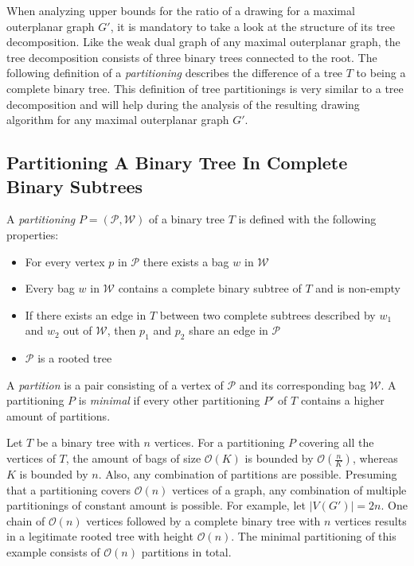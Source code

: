 When analyzing upper bounds for the ratio of a drawing for a maximal outerplanar graph $G'$, it is mandatory to take a look at the structure of its tree decomposition. Like the weak dual graph of any maximal outerplanar graph, the tree decomposition consists of three binary trees connected to the root. The following definition of a \emph{partitioning} describes the difference of a tree $T$ to being a complete binary tree. This definition of tree partitionings is very similar to a tree decomposition and will help during the analysis of the resulting drawing algorithm for any maximal outerplanar graph $G'$.
\subsection{Partitioning A Binary Tree In Complete Binary Subtrees}
\begin{definition}
	A \emph{partitioning} $P = (\mathcal{P},\mathcal{W})$ of a binary tree $T$ is defined with the following properties:
	\begin{itemize}
		\item For every vertex $p$ in $\mathcal{P}$ there exists a bag $w$ in $\mathcal{W}$
		\item Every bag $w$ in $\mathcal{W}$ contains a complete binary subtree of $T$ and is non-empty
		\item If there exists an edge in $T$ between two complete subtrees described by $w_1$ and $w_2$ out of $\mathcal{W}$, then $p_1$ and $p_2$ share an edge in $\mathcal{P}$
		\item $\mathcal{P}$ is a rooted tree		
	\end{itemize}
	A \emph{partition} is a pair consisting of a vertex of $\mathcal{P}$ and its corresponding bag $\mathcal{W}$. A partitioning $P$ is \emph{minimal} if every other partitioning $P'$ of $T$ contains a higher amount of partitions.
\end{definition}
Let $T$ be a binary tree with $n$ vertices. For a partitioning $P$ covering all the vertices of $T$, the amount of bags of size $\mathcal{O}(K)$ is bounded by $\mathcal{O}(\frac{n}{K})$, whereas $K$ is bounded by $n$. Also, any combination of partitions are possible. Presuming that a partitioning covers $\mathcal{O}(n)$ vertices of a graph, any combination of multiple partitionings of constant amount is possible. For example, let $|V(G')| = 2n$. One chain of $\mathcal{O}(n)$ vertices followed by a complete binary tree with $n$ vertices results in a legitimate rooted tree with height $\mathcal{O}(n)$. The minimal partitioning of this example consists of $\mathcal{O}(n)$ partitions in total.
